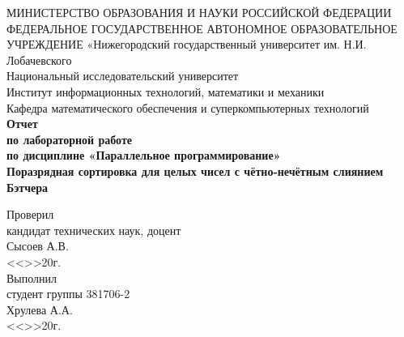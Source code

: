 \documentclass[a4paper,final]{report}
\begin{document}
	\begin{titlepage}
	
		\begin{center} 
			\MakeUppercase{Министерство образования и науки Российской федерации} \linebreak  
			\MakeUppercase{Федеральное государственное автономное образовательное учреждение} \linebreak
			«Нижегородский государственный университет им. Н.И. Лобачевского\\[0.2cm] 
			Национальный исследовательский университет\\[0.1cm] 
			Институт информационных технологий, математики и механики \\[0.1cm]  
			Кафедра математического обеспечения и суперкомпьютерных технологий\\[2.5cm]
			{\huge \bfseries Отчет \\[0.1cm]
				\Large \mdseries по лабораторной работе \\[0,1cm]
				\Large \mdseries по дисциплине «Параллельное программирование» \\[1cm]
				\Large \bfseries Поразрядная сортировка для целых чисел с чётно-нечётным слиянием Бэтчера}\\[3cm]
		\end{center}
    
		\begin{flushright} \large
			{Проверил} \\[0.1cm]
			{кандидат технических наук, доцент}\\[0.1cm]
			{\underline{\hspace{2,35in}} Сысоев А.В.}\\[0.1cm]
			{<<\underline{\hspace{0,25in}}>>\underline{\hspace{2,55in}}20\underline{\hspace{0,3in}}г.} \\[0.1cm]
			{Выполнил} \\[0.1cm]
			{студент группы 381706-2} \\[0.1cm]
			{\underline{\hspace{2,1in}} Хрулева А.А.} \\[0.1cm]
			{<<\underline{\hspace{0,25in}}>>\underline{\hspace{2,55in}}20\underline{\hspace{0,3in}}г.} \\[3cm]
		\end{flushright}
		
	\end{titlepage}
	
\end{document}
